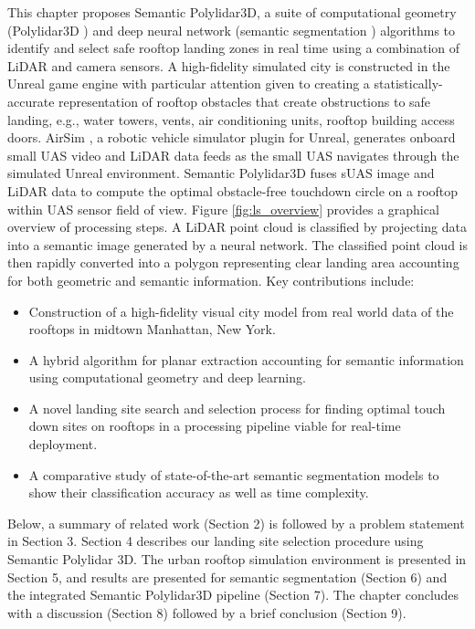 This chapter proposes Semantic Polylidar3D, a suite of computational geometry (Polylidar3D \cite{castagno_polylidar3d_2020}) and deep neural network (semantic segmentation \cite{howard_mobilenets_2017, ronneberger_u-net_2015}) algorithms to identify and select safe rooftop landing zones in real time using a combination of LiDAR and camera sensors.  A high-fidelity simulated city is constructed in the Unreal game engine \cite{unrealengine} with particular attention given to creating a statistically-accurate representation of rooftop obstacles that create obstructions to safe landing, e.g., water towers, vents, air conditioning units, rooftop building access doors.    AirSim \cite{shah_airsim_2018}, a robotic vehicle simulator plugin for Unreal, generates onboard small UAS video and LiDAR data feeds as the small UAS navigates through the simulated Unreal environment.  Semantic Polylidar3D fuses \ac{sUAS} image and LiDAR data to compute the optimal obstacle-free touchdown circle on a rooftop within UAS sensor field of view. Figure \ref{fig:ls_overview} provides a graphical overview of processing steps. A LiDAR point cloud is classified by projecting data into a semantic image generated by a neural network. The classified point cloud is then rapidly converted into a polygon representing clear landing area accounting for both geometric and semantic information. Key contributions include:

\begin{itemize}
  \item Construction of a high-fidelity visual city model from real world data of the rooftops in midtown Manhattan, New York.
  \item A hybrid algorithm for planar extraction accounting for semantic information using computational geometry and deep learning.
  \item A novel landing site search and selection process for finding optimal touch down sites on rooftops in a processing pipeline viable for real-time deployment. 
  \item A comparative study of state-of-the-art semantic segmentation models to show their classification accuracy as well as time complexity.
\end{itemize}

Below, a summary of related work (Section 2) is followed by a problem statement in Section 3.  Section 4 describes our landing site selection procedure using Semantic Polylidar 3D.  The urban rooftop simulation environment is presented in Section 5, and results are presented for semantic segmentation (Section 6) and the integrated Semantic Polylidar3D pipeline (Section 7).  The chapter concludes with a discussion (Section 8) followed by a brief conclusion (Section 9).